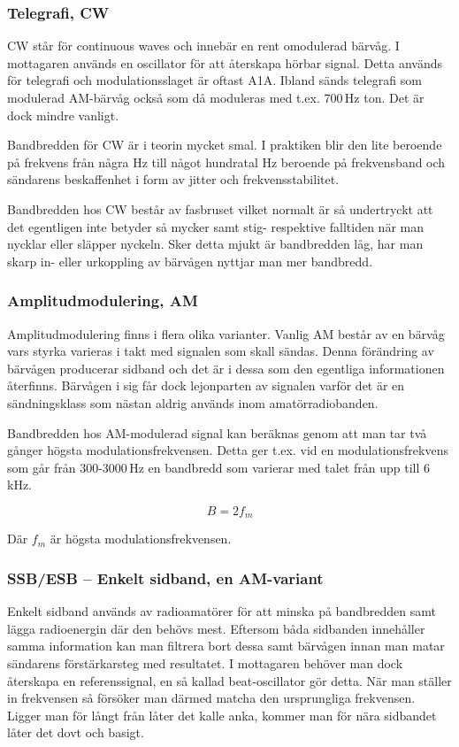 \subsubsection{Telegrafi, CW}

CW står för continuous waves och innebär en rent omodulerad bärvåg. I mottagaren används en oscillator för att återskapa hörbar signal. Detta används för telegrafi och modulationsslaget är oftast A1A. Ibland sänds telegrafi som modulerad AM-bärvåg också som då moduleras med t.ex. 700\,Hz ton. Det är dock mindre vanligt.

Bandbredden för CW är i teorin mycket smal. I praktiken blir den lite beroende på frekvens från några Hz till något hundratal Hz beroende på frekvensband och sändarens beskaffenhet i form av jitter och frekvensstabilitet.

Bandbredden hos CW består av fasbruset vilket normalt är så undertryckt att det egentligen inte betyder så mycker samt stig- respektive falltiden när man nycklar eller släpper nyckeln. Sker detta mjukt är bandbredden låg, har man skarp in- eller urkoppling av bärvågen nyttjar man mer bandbredd.

\subsubsection{Amplitudmodulering, AM}

Amplitudmodulering finns i flera olika varianter. Vanlig AM består av en bärvåg vars styrka varieras i takt med signalen som skall sändas. Denna förändring av bärvågen producerar sidband och det är i dessa som den egentliga informationen återfinns. Bärvågen i sig får dock lejonparten av signalen varför det är en sändningsklass som nästan aldrig används inom amatörradiobanden.

Bandbredden hos AM-modulerad signal kan beräknas genom att man tar två gånger högsta modulationsfrekvensen. Detta ger t.ex. vid en modulationsfrekvens som går från 300-3000\,Hz en bandbredd som varierar med talet från upp till 6\,kHz.

$$B=2f_m$$

Där $f_m$ är högsta modulationsfrekvensen.

\subsubsection{SSB/ESB -- Enkelt sidband, en AM-variant}

Enkelt sidband används av radioamatörer för att minska på bandbredden samt lägga radioenergin där den behövs mest. Eftersom båda sidbanden innehåller samma information kan man filtrera bort dessa samt bärvågen innan man matar sändarens förstärkarsteg med resultatet. I mottagaren behöver man dock återskapa en referenssignal, en så kallad beat-oscillator gör detta. När man ställer in frekvensen så försöker man därmed matcha den ursprungliga frekvensen. Ligger man för långt från låter det kalle anka, kommer man för nära sidbandet låter det dovt och basigt. 

